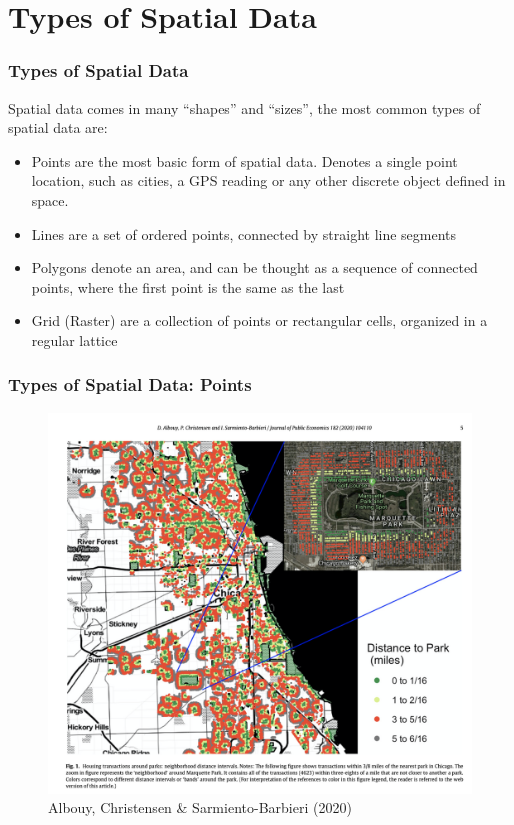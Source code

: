 \documentclass[
  shownotes,
  xcolor={svgnames},
  hyperref={colorlinks,citecolor=DarkBlue,linkcolor=DarkRed,urlcolor=DarkBlue}
  ]{beamer}
\begin{document}
\section{Types of Spatial Data}
\begin{frame}[fragile]
\frametitle{Types of Spatial Data}
Spatial data comes in many ``shapes'' and ``sizes'', the most common types of spatial data are:
\medskip
\begin{itemize}
	\item Points are the most basic form of spatial data. Denotes a single point location, such as cities, a GPS reading or any other discrete object defined in space.
	\medskip
	\item Lines are a set of ordered points, connected by straight line segments
	\medskip
	\item Polygons denote an area, and can be thought as a sequence of connected points, where the first point is the same as the last
	\medskip
	\item Grid (Raster) are a collection of points or rectangular cells, organized in a regular lattice
\end{itemize}

\end{frame}
\begin{frame}[fragile]
\frametitle{Types of Spatial Data: Points}

\begin{figure}[H] \centering
  
\includegraphics[scale=0.35]{figures/albouy_et_al_fig1.png}
  \\
  \tiny Albouy, Christensen \& Sarmiento-Barbieri (2020)
\end{figure}


\end{frame}
\end{document}

